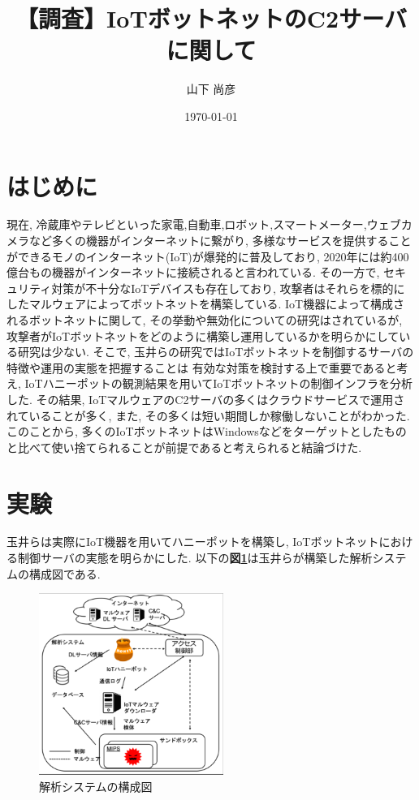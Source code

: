\documentclass[twocolumn,10pt]{ltjsarticle}
\title{【調査】IoTボットネットのC2サーバに関して}
\author{山下 尚彦}
\date{\today}
\begin{document}
\maketitle

\section{はじめに}
現在, 冷蔵庫やテレビといった家電,自動車,ロボット,スマートメーター,ウェブカメラなど多くの機器がインターネットに繋がり, 
多様なサービスを提供することができるモノのインターネット(IoT)が爆発的に普及しており, 
2020年には約400億台もの機器がインターネットに接続されると言われている\cite{総務省2018IoT}. 
その一方で, セキュリティ対策が不十分なIoTデバイスも存在しており, 
攻撃者はそれらを標的にしたマルウェアによってボットネットを構築している. 
IoT機器によって構成されるボットネットに関して, その挙動や無効化についての研究はされているが, 
攻撃者がIoTボットネットをどのように構築し運用しているかを明らかにしている研究は少ない.
そこで, 玉井らの研究\cite{玉井達也2019制御サーバ}ではIoTボットネットを制御するサーバの特徴や運用の実態を把握することは
有効な対策を検討する上で重要であると考え, IoTハニーポットの観測結果を用いてIoTボットネットの制御インフラを分析した. 
その結果, IoTマルウェアのC2サーバの多くはクラウドサービスで運用されていることが多く, 
また, その多くは短い期間しか稼働しないことがわかった. 
このことから, 多くのIoTボットネットはWindowsなどをターゲットとしたものと比べて使い捨てられることが前提であると考えられると結論づけた. 

\section{実験}
玉井らは実際にIoT機器を用いてハニーポットを構築し, IoTボットネットにおける制御サーバの実態を明らかにした. 
以下の\textbf{図\ref{fig:experiment_environment}}は玉井らが構築した解析システムの構成図である. 

\begin{figure}[htb]
    \centering
    \includegraphics[width=6cm]{images/【調査】IoTボットネットのC2サーバに関して/experiment_environment.png}
    \caption{解析システムの構成図}
    \label{fig:experiment_environment}
\end{figure}
\end{document}
